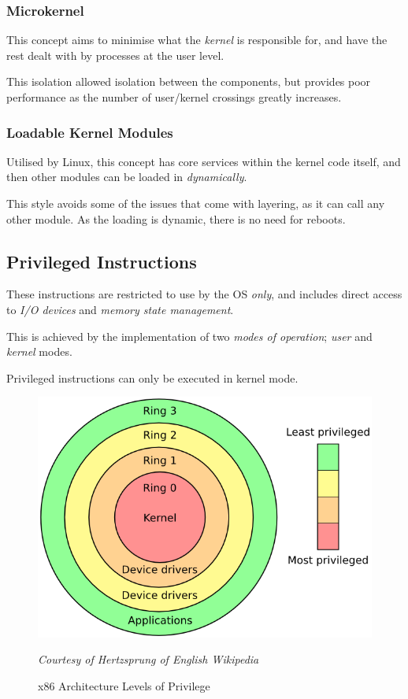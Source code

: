 \documentclass{article}
\begin{document}
\subsubsection{Microkernel}

This concept aims to minimise what the \textit{kernel} is responsible for, and have the rest dealt with by processes at the user level.

This isolation allowed isolation between the components, but provides poor performance as the number of user/kernel crossings greatly increases.

\subsubsection{Loadable Kernel Modules}

Utilised by Linux, this concept has core services within the kernel code itself, and then other modules can be loaded in \textit{dynamically}.

This style avoids some of the issues that come with layering, as it can call any other module. As the loading is dynamic, there is no need for reboots.

\filbreak
\subsection{Privileged Instructions}

These instructions are restricted to use by the OS \textit{only}, and includes direct access to \textit{I/O devices} and \textit{memory state management}.

This is achieved by the implementation of two \textit{modes of operation}; \textit{user} and \textit{kernel} modes.

Privileged instructions can only be executed in kernel mode.

\begin{figure}[h!]
  \centering
  \includegraphics[scale=0.35]{privilegeGraphX86}
  \caption{x86 Architecture Levels of Privilege}
  \textit{\footnotesize Courtesy of Hertzsprung of English Wikipedia}
\end{figure}
\end{document}
